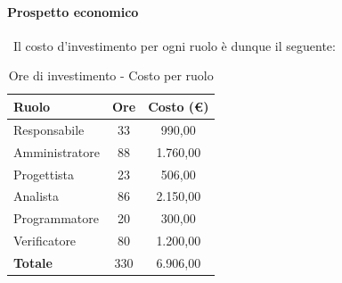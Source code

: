 \documentclass[../PianoProgetto.tex]{subfiles}
\begin{document}
	\paragraph{Prospetto economico}\
					Il costo d'investimento per ogni ruolo è dunque il seguente:
	\begin{table}[H]
		\centering
		\begin{tabular}{l * {2}{c}}
			\toprule
			\textbf{Ruolo} & \textbf{Ore} & \textbf{Costo (\euro{})} \\
			\midrule
			Responsabile & 33    & 990,00 \\
			Amministratore  & 88    & 1.760,00 \\
			Progettista  & 23    & 506,00 \\
			Analista & 86    & 2.150,00 \\
			Programmatore  & 20    & 300,00 \\
			Verificatore  & 80    & 1.200,00 \\
			\midrule
			\textbf{Totale}  & 330   & 6.906,00 \\
			\bottomrule
		\end{tabular}
		\caption{Ore di investimento - Costo per ruolo}
		\label{tab:investimento_costo}
	\end{table}
\vfill	
	
\end{document}
